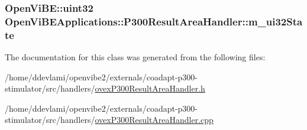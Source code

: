 \label{classOpenViBEApplications_1_1P300ResultAreaHandler_a25f33b2c3dddf96cdee177cfefd13885}
\hypertarget{classOpenViBEApplications_1_1P300ResultAreaHandler_a0b7002021dda92347f5b6316602d0808}{
\subsubsection[{m\_\-ui32State}]{\setlength{\rightskip}{0pt plus 5cm}OpenViBE::uint32 {\bf OpenViBEApplications::P300ResultAreaHandler::m\_\-ui32State}}}
\label{classOpenViBEApplications_1_1P300ResultAreaHandler_a0b7002021dda92347f5b6316602d0808}


The documentation for this class was generated from the following files:\begin{DoxyCompactItemize}
\item 
/home/ddevlami/openvibe2/externals/coadapt-\/p300-\/stimulator/src/handlers/\hyperlink{ovexP300ResultAreaHandler_8h}{ovexP300ResultAreaHandler.h}\item 
/home/ddevlami/openvibe2/externals/coadapt-\/p300-\/stimulator/src/handlers/\hyperlink{ovexP300ResultAreaHandler_8cpp}{ovexP300ResultAreaHandler.cpp}\end{DoxyCompactItemize}
